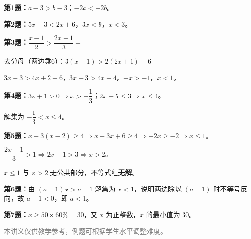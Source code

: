 \documentclass[12pt, a4paper]{ctexart}
\begin{document}
\begin{knowledgebox}[参考答案]
\textbf{第1题：}$a - 3 > b - 3$；$-2a < -2b$。

\textbf{第2题：}$5x - 3 < 2x + 6$，$3x < 9$，$x < 3$。

\begin{center}
\end{center}

\textbf{第3题：}$\dfrac{x-1}{2} > \dfrac{2x+1}{3} - 1$

去分母（两边乘6）：$3(x-1) > 2(2x+1) - 6$

$3x - 3 > 4x + 2 - 6$，$3x - 3 > 4x - 4$，$-x > -1$，$x < 1$。

\textbf{第4题：}$3x + 1 > 0 \Rightarrow x > -\dfrac{1}{3}$；$2x - 5 \leqslant 3 \Rightarrow x \leqslant 4$。

解集为 $-\dfrac{1}{3} < x \leqslant 4$。

\textbf{第5题：}$x - 3(x-2) \geqslant 4 \Rightarrow x - 3x + 6 \geqslant 4 \Rightarrow -2x \geqslant -2 \Rightarrow x \leqslant 1$。

$\dfrac{2x-1}{3} > 1 \Rightarrow 2x - 1 > 3 \Rightarrow x > 2$。

$x \leqslant 1$ 与 $x > 2$ 无公共部分，不等式组\textbf{无解}。

\textbf{第6题：}由 $(a-1)x > a-1$ 解集为 $x < 1$，说明两边除以 $(a-1)$ 时不等号反向，故 $a - 1 < 0$，即 $a < 1$。

\textbf{第7题：}$x \geqslant 50 \times 60\% = 30$，又 $x$ 为正整数，$x$ 的最小值为 $30$。
\end{knowledgebox}

\vfill
\begin{center}
\small\textcolor{gray}{本讲义仅供教学参考，例题可根据学生水平调整难度。}
\end{center}
\end{document}
